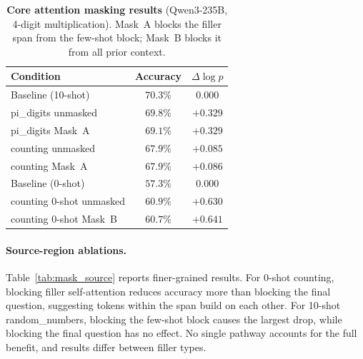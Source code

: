 \documentclass{article}
\begin{document}
\begin{table}[h]
\centering
\caption{\textbf{Core attention masking results} (Qwen3-235B, 4-digit multiplication). Mask~A blocks the filler span from the few-shot block; Mask~B blocks it from all prior context.}
\label{tab:mask_core}
\small
{}
\begin{tabular}{@{}lcc@{}}
\toprule
\textbf{Condition} & \textbf{Accuracy} & \textbf{$\Delta \log p$} \\
\midrule
Baseline (10-shot)        & $70.3\%$ & $0.000$ \\
pi\_digits unmasked       & $69.8\%$ & $+0.329$ \\
pi\_digits Mask~A         & $69.1\%$ & $+0.329$ \\
counting unmasked         & $67.9\%$ & $+0.085$ \\
counting Mask~A           & $67.9\%$ & $+0.086$ \\
\midrule
Baseline (0-shot)         & $57.3\%$ & $0.000$ \\
counting 0-shot unmasked  & $60.9\%$ & $+0.630$ \\
counting 0-shot Mask~B    & $60.7\%$ & $+0.641$ \\
\bottomrule
\end{tabular}
\end{table}

\paragraph{Source-region ablations.} Table~\ref{tab:mask_source} reports finer-grained results. For 0-shot counting, blocking filler self-attention reduces accuracy more than blocking the final question, suggesting tokens within the span build on each other. For 10-shot random\_numbers, blocking the few-shot block causes the largest drop, while blocking the final question has no effect. No single pathway accounts for the full benefit, and results differ between filler types.
\end{document}
